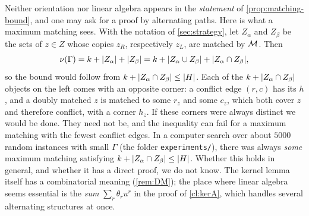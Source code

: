 \begin{remark}\label{rem:combinatorial}
Neither orientation nor linear algebra appears in the \emph{statement} of
\cref{prop:matching-bound}, and one may ask for a proof by alternating
paths. Here is what a maximum matching sees. With the notation of
\cref{sec:strategy}, let $Z_\alpha$ and $Z_\beta$ be the sets of $z\in Z$
whose copies $z_R$, respectively $z_L$, are matched by $\mathcal M$. Then
\[
 \nu(\Gamma)=k+\lvert Z_\alpha\rvert+\lvert Z_\beta\rvert
 =k+\lvert Z_\alpha\cup Z_\beta\rvert+\lvert Z_\alpha\cap Z_\beta\rvert,
\]
so the bound would follow from $k+\lvert Z_\alpha\cap Z_\beta\rvert\le\lvert H\rvert$.
Each of the $k+\lvert Z_\alpha\cap Z_\beta\rvert$ objects on the left comes with
an opposite corner: a conflict edge $(r,c)$ has its $h$, and a doubly
matched $z$ is matched to some $r_z$ and some $c_z$, which both cover $z$
and therefore conflict, with a corner $h_z$. If these corners were always
distinct we would be done. They need not be, and the inequality can fail
for a maximum matching with the fewest conflict edges. In a computer
search over about $5000$ random instances with small $\Gamma$ (the folder
\texttt{experiments/}), there was always \emph{some} maximum matching
satisfying $k+\lvert Z_\alpha\cap Z_\beta\rvert\le\lvert H\rvert$. Whether this holds in
general, and whether it has a direct proof, we do not know. The kernel
lemma itself has a combinatorial meaning (\cref{rem:DM}); the place where
linear algebra seems essential is the \emph{sum} $\sum_r\theta_ru^r$ in the
proof of \cref{cl:kerA}, which handles several alternating structures at
once.
\end{remark}
